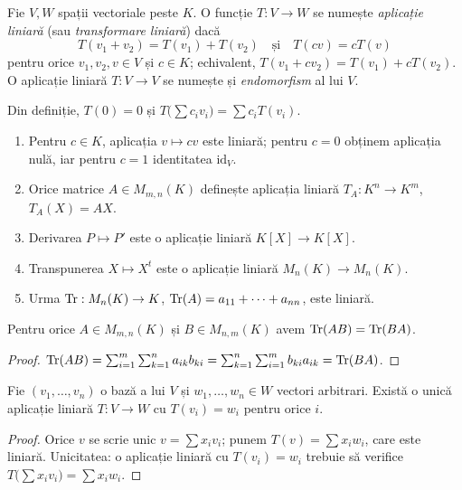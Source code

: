 \begin{definitie}
Fie $V,W$ spații vectoriale peste $K$. O funcție $T:V\to W$ se numește \emph{aplicație liniară} (sau \emph{transformare liniară}) dacă
\[
T(v_1+v_2)=T(v_1)+T(v_2)\quad\text{și}\quad T(cv)=cT(v)
\]
pentru orice $v_1,v_2,v\in V$ și $c\in K$; echivalent, $T(v_1+cv_2)=T(v_1)+cT(v_2)$. O aplicație liniară $T:V\to V$ se numește și \emph{endomorfism} al lui $V$.
\end{definitie}

Din definiție, $T(0)=0$ și $T\bigl(\sum c_iv_i\bigr)=\sum c_iT(v_i)$.

\begin{exemplu}
\begin{enumerate}
\item Pentru $c\in K$, aplicația $v\mapsto cv$ este liniară; pentru $c=0$ obținem aplicația nulă, iar pentru $c=1$ identitatea $\mathrm{id}_V$.
\item Orice matrice $A\in M_{m,n}(K)$ definește aplicația liniară $T_A:K^n\to K^m$, $T_A(X)=AX$.
\item Derivarea $P\mapsto P'$ este o aplicație liniară $K[X]\to K[X]$.
\item Transpunerea $X\mapsto X^t$ este o aplicație liniară $M_n(K)\to M_n(K)$.
\item Urma $\operatorname{Tr}:M_n(K)\to K$, $\operatorname{Tr}(A)=a_{11}+\cdots+a_{nn}$, este liniară.
\end{enumerate}
\end{exemplu}

\begin{propozitie}\label{prop:urma}
Pentru orice $A\in M_{m,n}(K)$ și $B\in M_{n,m}(K)$ avem $\operatorname{Tr}(AB)=\operatorname{Tr}(BA)$.
\end{propozitie}

\begin{proof}
$\operatorname{Tr}(AB)=\sum_{i=1}^m\sum_{k=1}^na_{ik}b_{ki}=\sum_{k=1}^n\sum_{i=1}^mb_{ki}a_{ik}=\operatorname{Tr}(BA)$.
\end{proof}

\begin{propozitie}\label{prop:determinataprinbaza}
Fie $(v_1,\dots,v_n)$ o bază a lui $V$ și $w_1,\dots,w_n\in W$ vectori arbitrari. Există o unică aplicație liniară $T:V\to W$ cu $T(v_i)=w_i$ pentru orice $i$.
\end{propozitie}

\begin{proof}
Orice $v$ se scrie unic $v=\sum x_iv_i$; punem $T(v)=\sum x_iw_i$, care este liniară. Unicitatea: o aplicație liniară cu $T(v_i)=w_i$ trebuie să verifice $T\bigl(\sum x_iv_i\bigr)=\sum x_iw_i$.
\end{proof}

